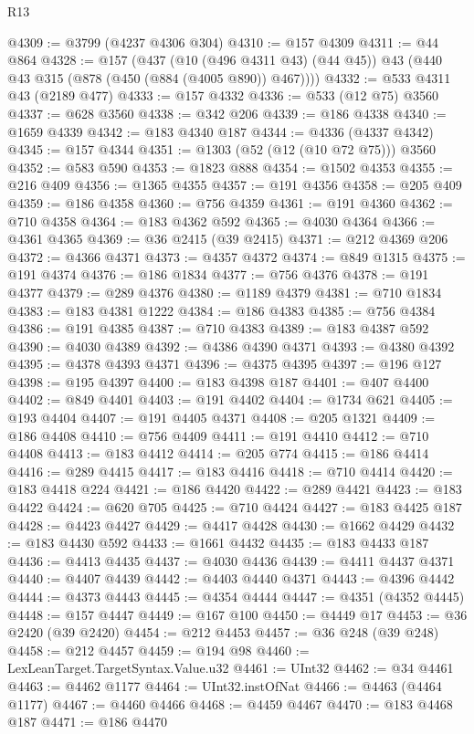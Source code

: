 \begin{lexlean}{R13}
\begin{coremodule}
@4309 := @3799 (@4237 @4306 @304)
@4310 := @157 @4309
@4311 := @44 @864
@4328 := @157
    (@437
      (@10 (@496 @4311 @43) (@44 @45))
      @43
      (@440 @43 @315 (@878 (@450 (@884 (@4005 @890)) @467))))
@4332 := @533 @4311 @43 (@2189 @477)
@4333 := @157 @4332
@4336 := @533 (@12 @75) @3560
@4337 := @628 @3560
@4338 := @342 @206
@4339 := @186 @4338
@4340 := @1659 @4339
@4342 := @183 @4340 @187
@4344 := @4336 (@4337 @4342)
@4345 := @157 @4344
@4351 := @1303 (@52 (@12 (@10 @72 @75))) @3560
@4352 := @583 @590
@4353 := @1823 @888
@4354 := @1502 @4353
@4355 := @216 @409
@4356 := @1365 @4355
@4357 := @191 @4356
@4358 := @205 @409
@4359 := @186 @4358
@4360 := @756 @4359
@4361 := @191 @4360
@4362 := @710 @4358
@4364 := @183 @4362 @592
@4365 := @4030 @4364
@4366 := @4361 @4365
@4369 := @36 @2415 (@39 @2415)
@4371 := @212 @4369 @206
@4372 := @4366 @4371
@4373 := @4357 @4372
@4374 := @849 @1315
@4375 := @191 @4374
@4376 := @186 @1834
@4377 := @756 @4376
@4378 := @191 @4377
@4379 := @289 @4376
@4380 := @1189 @4379
@4381 := @710 @1834
@4383 := @183 @4381 @1222
@4384 := @186 @4383
@4385 := @756 @4384
@4386 := @191 @4385
@4387 := @710 @4383
@4389 := @183 @4387 @592
@4390 := @4030 @4389
@4392 := @4386 @4390 @4371
@4393 := @4380 @4392
@4395 := @4378 @4393 @4371
@4396 := @4375 @4395
@4397 := @196 @127
@4398 := @195 @4397
@4400 := @183 @4398 @187
@4401 := @407 @4400
@4402 := @849 @4401
@4403 := @191 @4402
@4404 := @1734 @621
@4405 := @193 @4404
@4407 := @191 @4405 @4371
@4408 := @205 @1321
@4409 := @186 @4408
@4410 := @756 @4409
@4411 := @191 @4410
@4412 := @710 @4408
@4413 := @183 @4412
@4414 := @205 @774
@4415 := @186 @4414
@4416 := @289 @4415
@4417 := @183 @4416
@4418 := @710 @4414
@4420 := @183 @4418 @224
@4421 := @186 @4420
@4422 := @289 @4421
@4423 := @183 @4422
@4424 := @620 @705
@4425 := @710 @4424
@4427 := @183 @4425 @187
@4428 := @4423 @4427
@4429 := @4417 @4428
@4430 := @1662 @4429
@4432 := @183 @4430 @592
@4433 := @1661 @4432
@4435 := @183 @4433 @187
@4436 := @4413 @4435
@4437 := @4030 @4436
@4439 := @4411 @4437 @4371
@4440 := @4407 @4439
@4442 := @4403 @4440 @4371
@4443 := @4396 @4442
@4444 := @4373 @4443
@4445 := @4354 @4444
@4447 := @4351 (@4352 @4445)
@4448 := @157 @4447
@4449 := @167 @100
@4450 := @4449 @17
@4453 := @36 @2420 (@39 @2420)
@4454 := @212 @4453
@4457 := @36 @248 (@39 @248)
@4458 := @212 @4457
@4459 := @194 @98
@4460 := LexLeanTarget.TargetSyntax.Value.u32
@4461 := UInt32
@4462 := @34 @4461
@4463 := @4462 @1177
@4464 := UInt32.instOfNat
@4466 := @4463 (@4464 @1177)
@4467 := @4460 @4466
@4468 := @4459 @4467
@4470 := @183 @4468 @187
@4471 := @186 @4470

\end{coremodule}
\end{lexlean}
